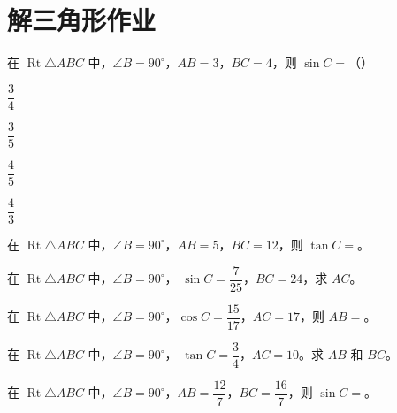 \documentclass{exam-zh}
\begin{document}
\section*{解三角形作业}



\begin{question}[points=4]
  在 $\operatorname{Rt}\triangle ABC$ 中，$\angle B=90^\circ$，$AB=3$，$BC=4$，则 $\sin C=$（\quad）
  
  \begin{choices}
    \item $\dfrac34$
    \item $\dfrac35$
    \item $\dfrac45$
    \item $\dfrac43$
  \end{choices}
\end{question}



\begin{question}[points=4]
  在 $\operatorname{Rt}\triangle ABC$ 中，$\angle B=90^\circ$，$AB=5$，$BC=12$，则 $\tan C=$\fillin。
  
\end{question}



\begin{problem}[points=4]
    在 $\operatorname{Rt}\triangle ABC$ 中，$\angle B=90^\circ$，
$\sin C=\dfrac7{25}$，$BC=24$，求 $AC$。

    
  \answerarea[28mm]
\end{problem}




\begin{question}[points=4]
  在 $\operatorname{Rt}\triangle ABC$ 中，$\angle B=90^\circ$，$\cos C=\dfrac{15}{17}$，$AC=17$，则 $AB=$\fillin。
  
\end{question}



\begin{problem}[points=4]
    在 $\operatorname{Rt}\triangle ABC$ 中，$\angle B=90^\circ$，
$\tan C=\dfrac34$，$AC=10$。求 $AB$ 和 $BC$。

    
  \answerarea[32mm]
\end{problem}



\begin{question}[points=4]
  在 $\operatorname{Rt}\triangle ABC$ 中，$\angle B=90^\circ$，$AB=\dfrac{12}{7}$，$BC=\dfrac{16}{7}$，则 $\sin C=$\fillin。
  
\end{question}
\end{document}
